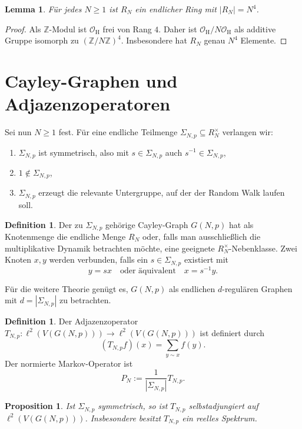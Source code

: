 \documentclass[12pt,a4paper]{article}
\theoremstyle{plain}
\newtheorem{lemma}[satz]{Lemma}
\newtheorem{proposition}[satz]{Proposition}
\theoremstyle{definition}
\newtheorem{definition}[satz]{Definition}
\theoremstyle{remark}
\newcommand{\Z}{\mathbb{Z}}
\newcommand{\OH}{\mathcal{O}_{\mathrm H}}
\newcommand{\RN}{R_N}
\newcommand{\SNp}{\Sigma_{N,p}}
\newcommand{\GNp}{G(N,p)}
\newcommand{\TNp}{T_{N,p}}
\newcommand{\PN}{P_N}
\begin{document}
\begin{lemma}
Für jedes \(N\ge 1\) ist \(\RN\) ein endlicher Ring mit \(|\RN|=N^4\).
\end{lemma}

\begin{proof}
Als \(\Z\)-Modul ist \(\OH\) frei von Rang \(4\). Daher ist \(\OH/N\OH\) als additive Gruppe isomorph zu \((\Z/N\Z)^4\). Insbesondere hat \(\RN\) genau \(N^4\) Elemente.
\end{proof}

\section{Cayley-Graphen und Adjazenzoperatoren}
Sei nun \(N\ge 1\) fest. Für eine endliche Teilmenge \(\SNp\subseteq \RN^\times\) verlangen wir:
\begin{enumerate}[label=(\roman*)]
\item \(\SNp\) ist symmetrisch, also mit \(s\in\SNp\) auch \(s^{-1}\in\SNp\),
\item \(1\notin \SNp\),
\item \(\SNp\) erzeugt die relevante Untergruppe, auf der der Random Walk laufen soll.
\end{enumerate}

\begin{definition}
Der zu \(\SNp\) gehörige Cayley-Graph \(\GNp\) hat als Knotenmenge die endliche Menge \(\RN\) oder, falls man ausschließlich die multiplikative Dynamik betrachten möchte, eine geeignete \(\RN^\times\)-Nebenklasse. Zwei Knoten \(x,y\) werden verbunden, falls ein \(s\in \SNp\) existiert mit
\[
 y=sx 
\quad\text{oder äquivalent}\quad
 x=s^{-1}y.
\]
\end{definition}

Für die weitere Theorie genügt es, \(\GNp\) als endlichen \(d\)-regulären Graphen mit \(d=|\SNp|\) zu betrachten.

\begin{definition}
Der Adjazenzoperator \(\TNp\colon \ell^2(V(\GNp))\to \ell^2(V(\GNp))\) ist definiert durch
\[
(\TNp f)(x)=\sum_{y\sim x} f(y).
\]
Der normierte Markov-Operator ist
\[
\PN := \frac{1}{|\SNp|}\TNp.
\]
\end{definition}

\begin{proposition}
Ist \(\SNp\) symmetrisch, so ist \(\TNp\) selbstadjungiert auf \(\ell^2(V(\GNp))\). Insbesondere besitzt \(\TNp\) ein reelles Spektrum.
\end{proposition}
\end{document}
